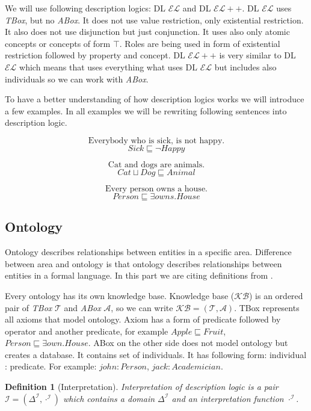 \documentclass[12pt,a4paper]{article}
\newtheorem{definition}{Definition}[subsection]
\begin{document}
We will use following description logics: DL $\mathcal{EL}$ and DL $\mathcal{EL{+}{+}}$. DL $\mathcal{EL}$  uses \textit{TBox}, but no \textit{ABox}. It does not use value restriction, only existential restriction. It also does not use disjunction but just conjunction. It uses also only atomic concepts or concepts of form $\top$. Roles are being used in form of existential restriction followed by property and concept. DL $\mathcal{EL{+}{+}}$ is very similar to DL $\mathcal{EL}$ which means that uses everything what uses DL $\mathcal{EL}$ but includes also individuals so we can work with \textit{ABox}.

To have a better understanding of how description logics works we will introduce a few examples. In all examples we will be rewriting following sentences into description logic.

\[ \text{Everybody who is sick, is not happy.} \]
\[ Sick \sqsubseteq \neg Happy \]

\[ \text{Cat and dogs are animals.} \]
\[ Cat \sqcup Dog \sqsubseteq Animal \]

\[ \text{Every person owns a house.} \]
\[ Person \sqsubseteq \exists owns.House \]

\subsection{Ontology}
Ontology describes relationships between entities in a specific area. Difference between area and ontology is that ontology describes relationships between entities in a formal language. In this part we are citing definitions from \citep{staabHandbookOntology}.

Every ontology has its own knowledge base. Knowledge base ($\mathcal{KB}$) is an ordered pair of \textit{TBox} $\mathcal{T}$ and \textit{ABox} $\mathcal{A}$, so we can write $\mathcal{KB} = (\mathcal{T}, \mathcal{A})$. TBox represents all axioms that model ontology. Axiom has a form of predicate followed by operator and another predicate, for example $Apple \sqsubseteq Fruit$, $Person \sqsubseteq \exists own.House$. ABox on the other side does not model ontology but creates a database. It contains set of individuals. It has following form: individual : predicate. For example: $john : Person$, $jack : Academician$.

\begin{definition}[Interpretation]
	Interpretation of description logic is a pair $\mathcal{I} = (\Delta^{\mathcal{I}}, \cdot ^{\mathcal{I}})$ which contains a domain $\Delta^{\mathcal{I}}$ and an interpretation function $\cdot ^{\mathcal{I}}$.	
\end{definition}
\end{document}
